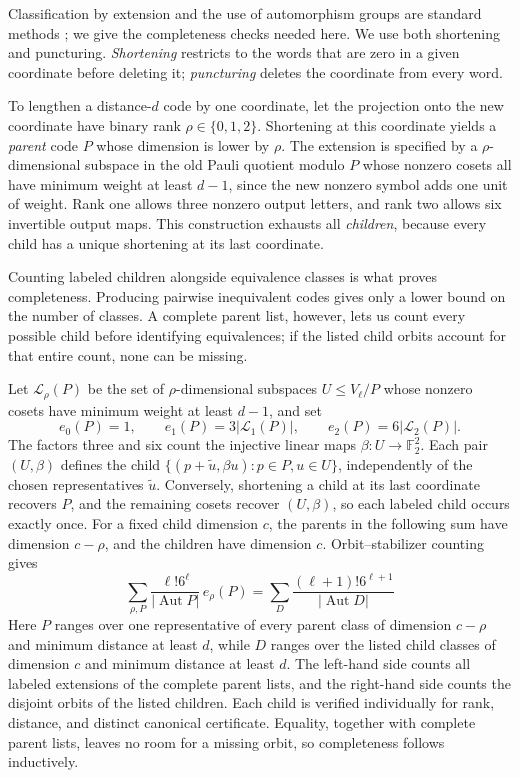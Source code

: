 \documentclass[11pt]{article}
\theoremstyle{definition}
\theoremstyle{remark}
\newcommand{\F}{\mathbb F_2}
\newcommand{\Aut}{\operatorname{Aut}}
\begin{document}
Classification by extension and the use of automorphism groups are
standard methods \cite{kaski}; we give the completeness checks needed
here. We use both shortening and puncturing. \emph{Shortening} restricts
to the words that are zero in a given coordinate before deleting it;
\emph{puncturing} deletes the coordinate from every word.

To lengthen a distance-\(d\) code by one coordinate, let the projection
onto the new coordinate have binary rank \(\rho\in\{0,1,2\}\).
Shortening at this coordinate yields a \emph{parent} code \(P\) whose
dimension is lower by \(\rho\). The extension is specified by a
\(\rho\)-dimensional subspace in the old Pauli quotient modulo \(P\)
whose nonzero cosets all have minimum weight at least \(d-1\), since the
new nonzero symbol adds one unit of weight. Rank one allows three
nonzero output letters, and rank two allows six invertible output maps.
This construction exhausts all \emph{children}, because every child has
a unique shortening at its last coordinate.

Counting labeled children alongside equivalence classes is what proves
completeness. Producing pairwise inequivalent codes gives only a lower
bound on the number of classes. A complete parent list, however, lets us
count every possible child before identifying equivalences; if the
listed child orbits account for that entire count, none can be missing.

Let \(\mathcal L_\rho(P)\) be the set of \(\rho\)-dimensional subspaces
\(U\leq V_\ell/P\) whose nonzero cosets have minimum weight at least
\(d-1\), and set
\[
 e_0(P)=1,\qquad e_1(P)=3|\mathcal L_1(P)|,\qquad
 e_2(P)=6|\mathcal L_2(P)|.
\]
The factors three and six count the injective linear maps
\(\beta:U\to\F^2\). Each pair \((U,\beta)\) defines the child
\(\{(p+\widetilde u,\beta u):p\in P,u\in U\}\), independently of the
chosen representatives \(\widetilde u\). Conversely, shortening a child
at its last coordinate recovers \(P\), and the remaining cosets recover
\((U,\beta)\), so each labeled child occurs exactly once. For a fixed
child dimension \(c\), the parents in the following sum have dimension
\(c-\rho\), and the children have dimension \(c\). Orbit--stabilizer
counting gives
\begin{equation}\label{eq:lengthening-mass}
 \sum_{\rho,P}\frac{\ell!6^\ell}{|\Aut P|}\,e_\rho(P)
 =\sum_D\frac{(\ell+1)!6^{\ell+1}}{|\Aut D|}
\end{equation}
Here \(P\) ranges over one representative of every parent class of
dimension \(c-\rho\) and minimum distance at least \(d\), while \(D\)
ranges over the listed child classes of dimension \(c\) and minimum
distance at least \(d\). The left-hand side counts all labeled
extensions of the complete parent lists, and the right-hand side counts
the disjoint orbits of the listed children. Each child is verified
individually for rank, distance, and distinct canonical certificate.
Equality, together with complete parent lists, leaves no room for a
missing orbit, so completeness follows inductively.
\end{document}
